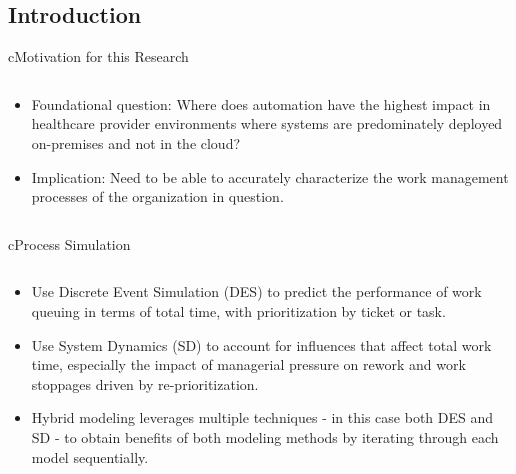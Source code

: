 \subsection*{Introduction}

\begin{myslide}{c}{Motivation for this Research}

\begin{columns}

\begin{column}{1\textwidth}

\begin{itemize}

\item Foundational question: Where does automation have the highest impact in healthcare provider environments where systems are predominately deployed on-premises and not in the cloud?

\item Implication: Need to be able to accurately characterize the work management processes of the organization in question.

\end{itemize}

\end{column}

\end{columns}

\end{myslide}

\begin{myslide}{c}{Process Simulation}

\begin{columns}

\begin{column}{1\textwidth}

\begin{itemize}

\item Use Discrete Event Simulation (DES) to predict the performance of work queuing in terms of total time, with prioritization by ticket or task.

\item Use System Dynamics (SD) to account for influences that affect total work time, especially the impact of managerial pressure on rework and work stoppages driven by re-prioritization.

\item Hybrid modeling leverages multiple techniques - in this case both DES and SD - to obtain benefits of both modeling methods by iterating through each model sequentially.

\end{itemize}

\end{column}

\end{columns}

\end{myslide}

